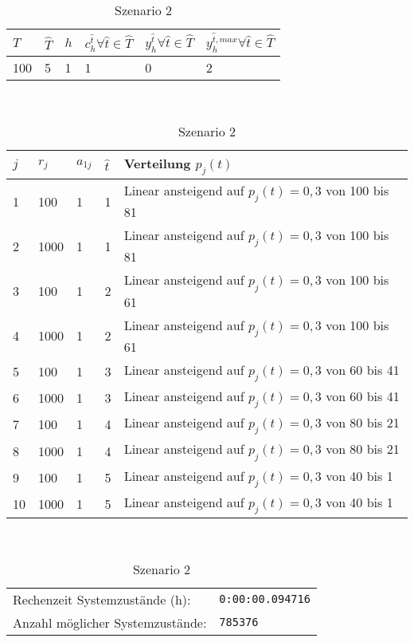 \begin{table}[h!]
\renewcommand{\arraystretch}{1.5}
  \begin{center}
    \caption{Szenario 2}  \label{S2}
    \vspace*{3mm}
    \begin{tabular}{l l l l l l}   %
    $T$ & $\hat T$  & $h$ & $c_h^{\hat t}\forall \hat{t}\in{\hat T}$ & $y_h^{\hat t}\forall \hat{t}\in{\hat T}$  & $y_h^{{\hat t},max}\forall \hat{t}\in{\hat T}$  \\  \hline
100 & 5 & 1 & 1 & 0 & 2  \\ \hline
    \end{tabular} \\[3mm]
        \begin{tabular}{p{.5cm} p{.5cm} p{.5cm}  p{.5cm} p{9cm}}   %
    $j$ & $r_j$  & $a_{1j}$ & $\hat t$ & Verteilung $p_j(t)$ \\  \hline
1 & 100 & 1 & 1 & Linear ansteigend auf $p_j(t)=0,3$ von 100 bis 81   \\
2 & 1000 & 1 & 1 & Linear ansteigend auf $p_j(t)=0,3$ von 100 bis 81  \\
3 & 100 & 1 & 2 & Linear ansteigend auf $p_j(t)=0,3$ von 100 bis 61  \\
4 & 1000 & 1 & 2 & Linear ansteigend auf $p_j(t)=0,3$ von 100 bis 61  \\
5 & 100 & 1 & 3 & Linear ansteigend auf $p_j(t)=0,3$ von 60 bis 41 \\
6 & 1000 & 1 & 3 & Linear ansteigend auf $p_j(t)=0,3$ von 60 bis 41 \\
7 & 100 & 1 & 4 & Linear ansteigend auf $p_j(t)=0,3$ von 80 bis 21  \\
8 & 1000 & 1 & 4 & Linear ansteigend auf $p_j(t)=0,3$ von 80 bis 21  \\
9 & 100 & 1 & 5 & Linear ansteigend auf $p_j(t)=0,3$ von 40 bis 1  \\
10 & 1000 & 1 & 5 & Linear ansteigend auf $p_j(t)=0,3$ von 40 bis 1  \\ \hline
    \end{tabular} \\[3mm]
     \begin{tabular}{p{7cm}p{5cm}} \hline
     Rechenzeit Systemzustände (h): & \texttt{0:00:00.094716} \\
     Anzahl möglicher Systemzustände: & \texttt{785376} \\

\end{tabular}
\end{center}
\end{table}
